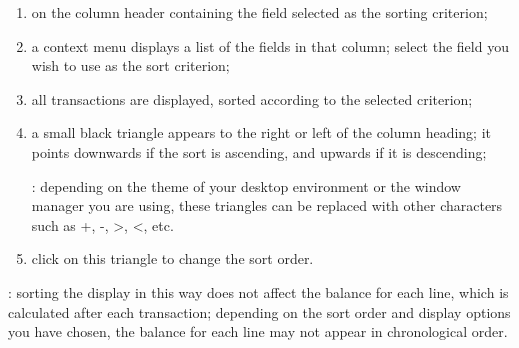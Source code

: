 \begin{enumerate}
	\item {} on the column header containing the field selected as the \gls{sorting} criterion;
	\item a context menu displays a list of the fields in that column; select the field you wish to use as the sort criterion;
	\item all transactions are displayed, sorted according to the selected criterion;
	\item a small black triangle appears to the right or left of the column heading; it points downwards if the sort is ascending, and upwards if it is descending;
	
	\Note{}: depending on the theme of your desktop environment or the window manager you are using, these triangles can be replaced with other characters such as +, -, >, <, etc.
	\item click on this triangle to change the sort order.
\end{enumerate}

\Note{}: sorting the display in this way does not affect the balance for each line, which is calculated after each transaction; depending on the sort order and display options you have chosen, the balance for each line may not appear in chronological order.

